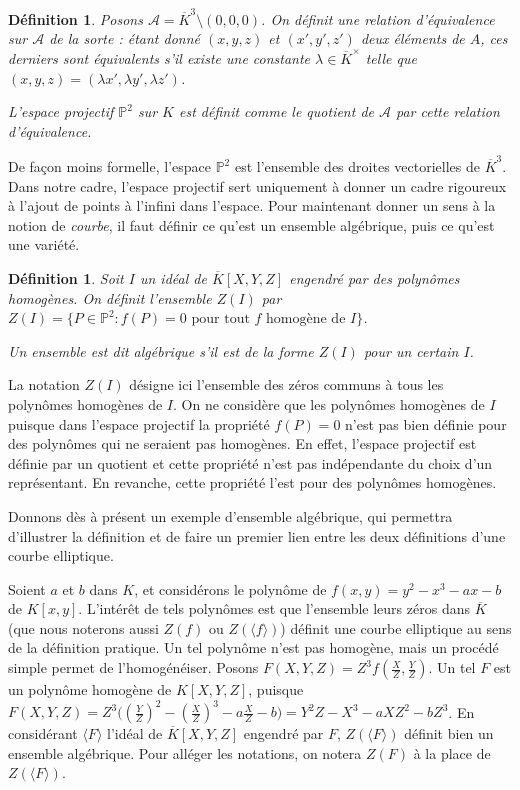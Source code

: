 \documentclass{article}
\theoremstyle{plain}%
\newtheorem{deff}[thm]{Définition}
\theoremstyle{definition}%
\newcommand{\ol}{\overline}
\begin{document}
\begin{deff}
  Posons $\mathcal{A} = \ol K^3\setminus(0, 0, 0)$. On définit une relation d'équivalence sur $\mathcal A$ de la sorte : étant donné $(x, y, z)$ et $(x', y', z')$ deux éléments de $A$, ces derniers sont équivalents s'il existe une constante $\lambda\in\ol K^\times$ telle que $(x, y, z) = (\lambda x', \lambda y', \lambda z')$.

  L'espace projectif $\mathbb P^2$ sur $K$ est définit comme le quotient de $\mathcal A$ par cette relation d'équivalence. 
\end{deff}

De façon moins formelle, l'espace $\mathbb P^2$ est l'ensemble des droites vectorielles de $\ol K^3$. Dans notre cadre, l'espace projectif sert uniquement à donner un cadre rigoureux à l'ajout de points à l'infini dans l'espace. Pour maintenant donner un sens à la notion de \emph{courbe}, il faut définir ce qu'est un ensemble algébrique, puis ce qu'est une variété.

\begin{deff}
  Soit $I$ un idéal de $\ol K[X, Y, Z]$ engendré par des polynômes homogènes. On définit l'ensemble $Z(I)$ par $Z(I) = \{ P\in \mathbb{P}^2 : f(P) = 0 \text{ pour tout } f \text{ homogène de } I \}$.

  Un ensemble est dit algébrique s'il est de la forme $Z(I)$ pour un certain $I$.
\end{deff}

La notation $Z(I)$ désigne ici l'ensemble des zéros communs à tous les polynômes homogènes de $I$. On ne considère que les polynômes homogènes de $I$ puisque dans l'espace projectif la propriété $f(P) = 0$ n'est pas bien définie pour des polynômes qui ne seraient pas homogènes. 
En effet, l'espace projectif est définie par un quotient et cette propriété n'est pas indépendante du choix d'un représentant. En revanche, cette propriété l'est pour des polynômes homogènes.

Donnons dès à présent un exemple d'ensemble algébrique, qui permettra d'illustrer la définition et de faire un premier lien entre les deux définitions d'une courbe elliptique.

Soient $a$ et $b$ dans $K$, et considérons le polynôme de $f(x, y) = y^2 -x^3 -ax -b$ de $K[x, y]$. 
L'intérêt de tels polynômes est que l'ensemble leurs zéros dans $\ol K$ (que nous noterons aussi $Z(f)$ ou $Z(\langle f \rangle)$) définit une courbe elliptique au sens de la définition pratique.  
Un tel polynôme n'est pas homogène, mais un procédé simple permet de l'homogénéiser. 
Posons $F(X, Y, Z) = Z^3f(\frac{X}{Z}, \frac{Y}{Z})$. 
Un tel $F$ est un polynôme homogène de $K[X, Y, Z]$, puisque $F(X, Y, Z) = Z^3\big((\frac{Y}{Z})^2 - (\frac{X}{Z})^3 -a\frac{X}{Z}-b\big) = Y^2Z - X^3 -aXZ^2 -bZ^3$. 
En considérant $\langle F \rangle$ l'idéal de $\ol K[X, Y, Z]$ engendré par $F$, $Z(\langle F \rangle)$ définit bien un ensemble algébrique. Pour alléger les notations, on notera $Z(F)$ à la place de $Z(\langle F\rangle)$. 
\end{document}
